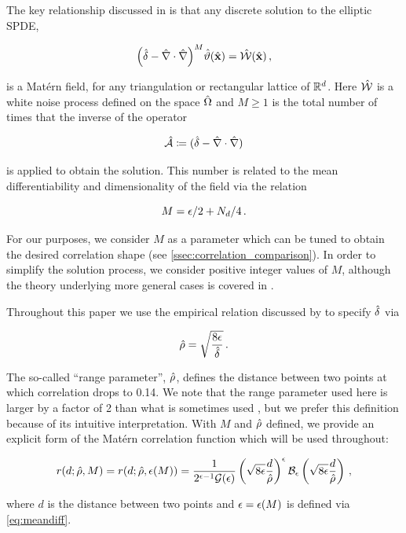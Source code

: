 The key relationship discussed in \citet{RSSB:RSSB777} is that any discrete solution to
the elliptic SPDE,
\begin{linenomath*}\begin{equation}
    \Big(\hat{\delta} - \hat{\nabla}\cdot\hat{\nabla}\Big)^{M}\hat{\vartheta}(\hat{\mathbf{x}}) =
    \hat{\mathcal{W}}(\hat{\mathbf{x}}) \, ,
    \label{eq:spde_iso}
\end{equation}\end{linenomath*}
is a Mat\'ern field, for any triangulation or rectangular lattice of $\mathbb{R}^{d}$.
Here
$\hat{\mathcal{W}}$ is a white noise process defined on the space $\hat{\Omega}$ and
$M\ge 1$ is the total number of times that the inverse of the operator
\begin{linenomath*}\begin{equation*}
\hat{\mathcal{A}} \coloneqq (\hat{\delta} - \hat{\nabla} \cdot \hat{\nabla})
\end{equation*}\end{linenomath*}
is applied to obtain the solution.
This number is related to the mean differentiability and
dimensionality of the field via the relation
\begin{linenomath*}\begin{equation}
    M = \epsilon/2 + N_{d}/4 \, .
    \label{eq:meandiff}
\end{equation}\end{linenomath*}
For our purposes, we consider $M$ as a parameter which can be tuned to obtain the
desired correlation shape (see \cref{ssec:correlation_comparison}).
In order to simplify the solution process, we consider positive integer values
of $M$, although the theory underlying more general cases is covered
in \citet{RSSB:RSSB777}.

Throughout this paper we use the empirical relation discussed by
\citet{RSSB:RSSB777} to specify $\hat{\delta}$ via
\begin{linenomath*}\begin{equation}
    \hat{\rho} = \sqrt{\dfrac{8\epsilon}{\hat{\delta}}} \, .
\end{equation}\end{linenomath*}
The so-called ``range parameter'', $\hat{\rho}$, defines the distance between two
points at which correlation drops to 0.14.
We note that the range parameter used here is larger by a factor of 2 than what
is sometimes used \citep[e.g.][]{rasmussen_gaussian_2006},
but we prefer this definition because of its intuitive interpretation.
With $M$ and $\hat{\rho}$ defined, we provide an explicit form of the Mat\'ern
correlation function which will be used throughout:
\begin{linenomath*}\begin{equation}
    r(d; \hat{\rho}, M) =
    r(d; \hat{\rho}, \epsilon(M)) =
    \dfrac{1}{2^{\epsilon-1}
    \mathcal{G}(\epsilon)}
    \left(\sqrt{8\epsilon} \dfrac{d}{\hat{\rho}}\right)^{\epsilon}
    \mathcal{B}_{\epsilon}
    \left(\sqrt{8\epsilon} \dfrac{d}{\hat{\rho}}\right) \, ,
\end{equation}\end{linenomath*}
where $d$ is the distance between two points and $\epsilon = \epsilon(M)$ is defined via
\cref{eq:meandiff}.

